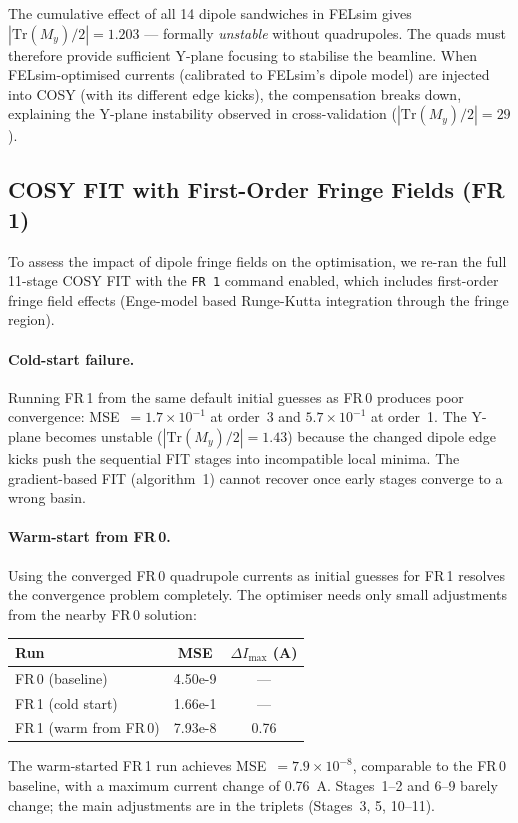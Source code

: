 \documentclass[11pt]{article}
\begin{document}
The cumulative effect of all 14 dipole sandwiches in FELsim gives
$|\mathrm{Tr}(M_y)/2| = 1.203$ --- formally \emph{unstable} without
quadrupoles. The quads must therefore provide sufficient Y-plane focusing
to stabilise the beamline. When FELsim-optimised currents (calibrated to
FELsim's dipole model) are injected into COSY (with its different edge
kicks), the compensation breaks down, explaining the Y-plane instability
observed in cross-validation ($|\mathrm{Tr}(M_y)/2| = 29$).


\subsection{COSY FIT with First-Order Fringe Fields (FR\,1)}
\label{sec:fr1}

To assess the impact of dipole fringe fields on the optimisation, we
re-ran the full 11-stage COSY FIT with the \texttt{FR\,1} command enabled,
which includes first-order fringe field effects (Enge-model based
Runge-Kutta integration through the fringe region).

\paragraph{Cold-start failure.}
Running FR\,1 from the same default initial guesses as FR\,0 produces
poor convergence: MSE~$= 1.7 \times 10^{-1}$ at order~3 and
$5.7 \times 10^{-1}$ at order~1. The Y-plane becomes unstable
($|\mathrm{Tr}(M_y)/2| = 1.43$) because the changed dipole edge kicks
push the sequential FIT stages into incompatible local minima. The
gradient-based FIT (algorithm~1) cannot recover once early stages
converge to a wrong basin.

\paragraph{Warm-start from FR\,0.}
Using the converged FR\,0 quadrupole currents as initial guesses for
FR\,1 resolves the convergence problem completely. The optimiser needs
only small adjustments from the nearby FR\,0 solution:
\begin{center}
\begin{tabular}{@{}lSS@{}}
\toprule
{Run} & {MSE} & {$\Delta I_\mathrm{max}$ (A)} \\
\midrule
FR\,0 (baseline)         & 4.50e-9  & {---} \\
FR\,1 (cold start)       & 1.66e-1  & {---} \\
FR\,1 (warm from FR\,0)  & 7.93e-8  & 0.76 \\
\bottomrule
\end{tabular}
\end{center}
The warm-started FR\,1 run achieves MSE~$= 7.9 \times 10^{-8}$,
comparable to the FR\,0 baseline, with a maximum current change of
0.76~A. Stages~1--2 and 6--9 barely change; the main adjustments are
in the triplets (Stages~3, 5, 10--11).
\end{document}
